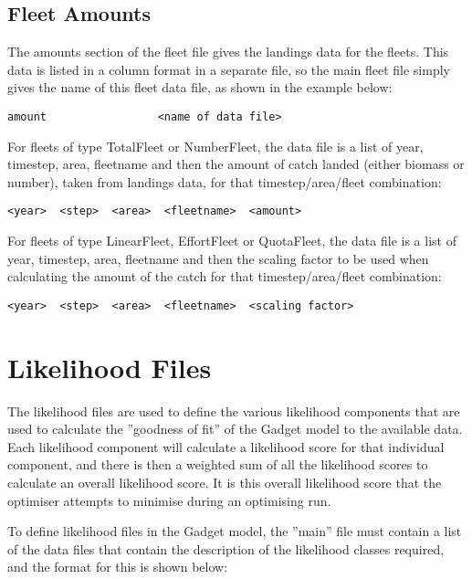 \documentclass[10pt,twoside]{book}
\begin{document}
\section{Fleet Amounts}\label{sec:fleetamount}
The amounts section of the fleet file gives the landings data for the fleets.  This data is listed in a column format in a separate file, so the main fleet file simply gives the name of this fleet data file, as shown in the example below:

{\small\begin{verbatim}
amount                 <name of data file>
\end{verbatim}}

For fleets of type TotalFleet or NumberFleet, the data file is a list of year, timestep, area, fleetname and then the amount of catch landed (either biomass or number), taken from landings data, for that timestep/area/fleet combination:

{\small\begin{verbatim}
<year>  <step>  <area>  <fleetname>  <amount>
\end{verbatim}}

For fleets of type LinearFleet, EffortFleet or QuotaFleet, the data file is a list of year, timestep, area, fleetname and then the scaling factor to be used when calculating the amount of the catch for that timestep/area/fleet combination:

{\small\begin{verbatim}
<year>  <step>  <area>  <fleetname>  <scaling factor>
\end{verbatim}}

\chapter{Likelihood Files}\label{chap:like}
The likelihood files are used to define the various likelihood components that are used to calculate the ''goodness of fit'' of the Gadget model to the available data.  Each likelihood component will calculate a likelihood score for that individual component, and there is then a weighted sum of all the likelihood scores to calculate an overall likelihood score.  It is this overall likelihood score that the optimiser attempts to minimise during an optimising run.

\bigskip
To define likelihood files in the Gadget model, the ''main'' file must contain a list of the data files that contain the description of the likelihood classes required, and the format for this is shown below:
\end{document}
